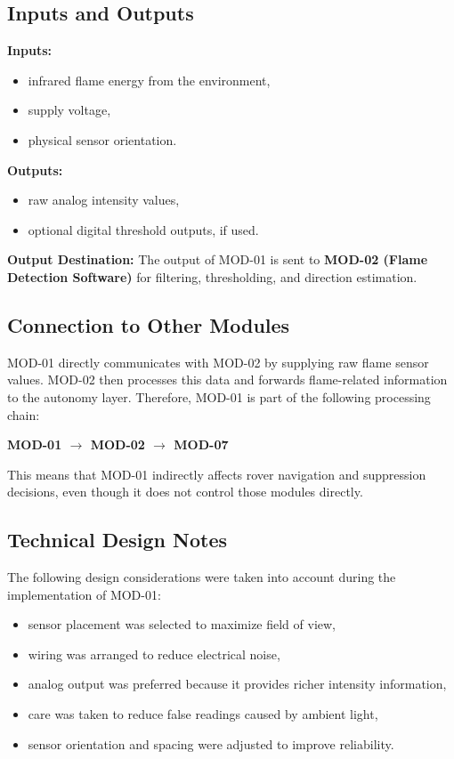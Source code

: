 \documentclass[12pt,a4paper]{article}
\begin{document}
\subsection{Inputs and Outputs}

\textbf{Inputs:}
\begin{itemize}[leftmargin=1.2cm]
    \item infrared flame energy from the environment,
    \item supply voltage,
    \item physical sensor orientation.
\end{itemize}

\textbf{Outputs:}
\begin{itemize}[leftmargin=1.2cm]
    \item raw analog intensity values,
    \item optional digital threshold outputs, if used.
\end{itemize}

\textbf{Output Destination:}  
The output of MOD-01 is sent to \textbf{MOD-02 (Flame Detection Software)} for filtering, thresholding, and direction estimation.

\subsection{Connection to Other Modules}

MOD-01 directly communicates with MOD-02 by supplying raw flame sensor values. MOD-02 then processes this data and forwards flame-related information to the autonomy layer. Therefore, MOD-01 is part of the following processing chain:

\begin{center}
\textbf{MOD-01 $\rightarrow$ MOD-02 $\rightarrow$ MOD-07}
\end{center}

This means that MOD-01 indirectly affects rover navigation and suppression decisions, even though it does not control those modules directly.

\subsection{Technical Design Notes}

The following design considerations were taken into account during the implementation of MOD-01:

\begin{itemize}[leftmargin=1.2cm]
    \item sensor placement was selected to maximize field of view,
    \item wiring was arranged to reduce electrical noise,
    \item analog output was preferred because it provides richer intensity information,
    \item care was taken to reduce false readings caused by ambient light,
    \item sensor orientation and spacing were adjusted to improve reliability.
\end{itemize}
\end{document}
